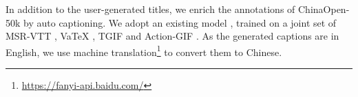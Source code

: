 In addition to the user-generated titles, we enrich the annotations of ChinaOpen-50k by auto captioning.  We adopt an existing model  \cite{DongCCHW021}, trained on a joint set of  MSR-VTT \cite{msrvtt}, VaTeX \cite{vatex}, TGIF \cite{tgif2015} and Action-GIF \cite{autogif}.  As the generated captions are in English, we use machine translation\footnote{\url{https://fanyi-api.baidu.com/}} to convert them to Chinese. 




















